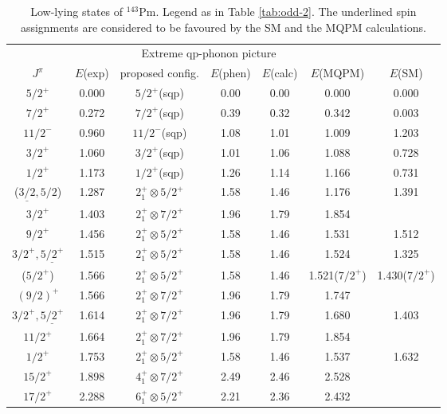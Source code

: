 \begin{table}[htbp]
\begin{center}
\caption{Low-lying states of $^{143}$Pm. Legend as in Table \ref{tab:odd-2}.
The underlined spin assignments are considered to be favoured by the SM
and the MQPM calculations.}
\begin{tabular}{cc|cccc|c}
\hline
& & \multicolumn{3}{c}{Extreme qp-phonon picture} & & \\
$J^{\pi}$ & $E$(exp) & proposed config. & $E$(phen) & $E$(calc) 
& $E$(MQPM) & $E$(SM) \\ 
\hline
$5/2^{+}$ & 0.000 & $5/2^+$(sqp) & 0.00 & 0.00 & 0.000 & 0.000 \\
$7/2^{+}$ & 0.272 & $7/2^+$(sqp) & 0.39 & 0.32 & 0.342 & 0.003 \\
$11/2^{-}$ & 0.960 & $11/2^-$(sqp) & 1.08 & 1.01 & 1.009 &1.203  \\
$3/2^{+}$ & 1.060 & $3/2^+$(sqp) & 1.01 & 1.06 & 1.088 & 0.728 \\
$1/2^{+}$ & 1.173 & $1/2^+$(sqp) & 1.26 & 1.14 & 1.166 & 0.731 \\
($\underline{3/2},5/2$) & 1.287 & $2^+_1\otimes 5/2^+$ & 1.58 & 
1.46 & 1.176 & 1.391 \\
$3/2^{+}$ & 1.403 & $2^+_1\otimes 7/2^+$ & 1.96 & 1.79 & 1.854 &  \\
$9/2^{+}$ & 1.456 & $2^+_1\otimes 5/2^+$ & 1.58 & 1.46 & 1.531 & 1.512 \\
$3/2^{+},\underline{5/2^{+}}$ & 1.515 & $2^+_1\otimes 5/2^+$ & 1.58 & 
1.46 & 1.524 & 1.325 \\
($5/2^{+}$) & 1.566 & $2^+_1\otimes 5/2^+$ & 1.58 & 1.46 & 
1.521($7/2^+$) & 1.430($7/2^+$) \\
$(9/2)^{+}$ & 1.566 & $2^+_1\otimes 7/2^+$  & 1.96 & 1.79 & 1.747 &  \\
$3/2^{+},\underline{5/2^{+}}$ & 1.614 & $2^+_1\otimes 7/2^+$ & 1.96 & 
1.79 & 1.680 & 1.403 \\
$11/2^{+}$ & 1.664 & $2^+_1\otimes 7/2^+$ & 1.96 & 1.79 & 1.854 &  \\
$1/2^{+}$ & 1.753 & $2^+_1\otimes 5/2^+$ & 1.58 & 1.46 & 1.537 &1.632   \\
$15/2^{+}$ & 1.898 & $4^+_1\otimes 7/2^+$ & 2.49 & 2.46 & 2.528 &  \\
$17/2^{+}$ & 2.288 & $6^+_1\otimes 5/2^+$ & 2.21 & 2.36 & 2.432 &  \\
\hline
\end{tabular}
\label{tab:odd-6}
\end{center}
\end{table}
